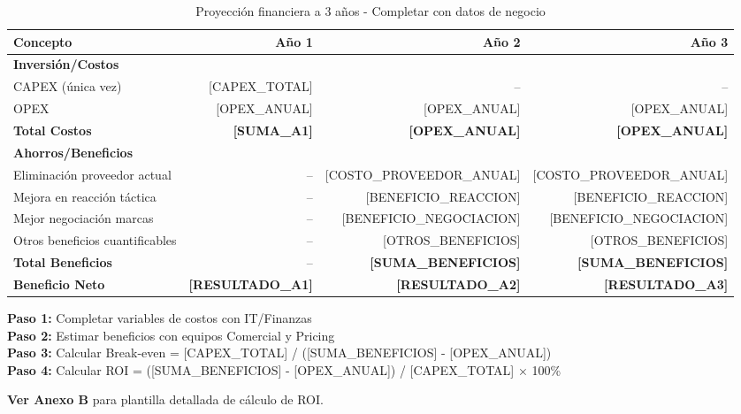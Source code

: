 \documentclass[12pt,a4paper]{article}
\begin{document}
\begin{table}[h]
\centering
\begin{tabularx}{\textwidth}{|X|r|r|r|}
\hline
\rowcolor{lightgray}
\textbf{Concepto} & \textbf{Año 1} & \textbf{Año 2} & \textbf{Año 3} \\
\hline
\textbf{Inversión/Costos} & & & \\
\hline
CAPEX (única vez) & [CAPEX\_TOTAL] & -- & -- \\
\hline
OPEX & [OPEX\_ANUAL] & [OPEX\_ANUAL] & [OPEX\_ANUAL] \\
\hline
\rowcolor{lightgray}
\textbf{Total Costos} & \textbf{[SUMA\_A1]} & \textbf{[OPEX\_ANUAL]} & \textbf{[OPEX\_ANUAL]} \\
\hline
\textbf{Ahorros/Beneficios} & & & \\
\hline
Eliminación proveedor actual & -- & [COSTO\_PROVEEDOR\_ANUAL] & [COSTO\_PROVEEDOR\_ANUAL] \\
\hline
Mejora en reacción táctica & -- & [BENEFICIO\_REACCION] & [BENEFICIO\_REACCION] \\
\hline
Mejor negociación marcas & -- & [BENEFICIO\_NEGOCIACION] & [BENEFICIO\_NEGOCIACION] \\
\hline
Otros beneficios cuantificables & -- & [OTROS\_BENEFICIOS] & [OTROS\_BENEFICIOS] \\
\hline
\rowcolor{lightgray}
\textbf{Total Beneficios} & -- & \textbf{[SUMA\_BENEFICIOS]} & \textbf{[SUMA\_BENEFICIOS]} \\
\hline
\rowcolor{successgreen!20}
\textbf{Beneficio Neto} & \textbf{[RESULTADO\_A1]} & \textbf{[RESULTADO\_A2]} & \textbf{[RESULTADO\_A3]} \\
\hline
\end{tabularx}
\caption{Proyección financiera a 3 años - Completar con datos de negocio}
\end{table}

\begin{tcolorbox}[colback=successgreen!20, colframe=successgreen, title=\textbf{Instrucciones para Cálculo de ROI}]
\textbf{Paso 1:} Completar variables de costos con IT/Finanzas\\
\textbf{Paso 2:} Estimar beneficios con equipos Comercial y Pricing\\
\textbf{Paso 3:} Calcular Break-even = [CAPEX\_TOTAL] / ([SUMA\_BENEFICIOS] - [OPEX\_ANUAL])\\
\textbf{Paso 4:} Calcular ROI = ([SUMA\_BENEFICIOS] - [OPEX\_ANUAL]) / [CAPEX\_TOTAL] × 100\%

\vspace{0.3cm}
\textbf{Ver Anexo B} para plantilla detallada de cálculo de ROI.
\end{tcolorbox}
\end{document}
